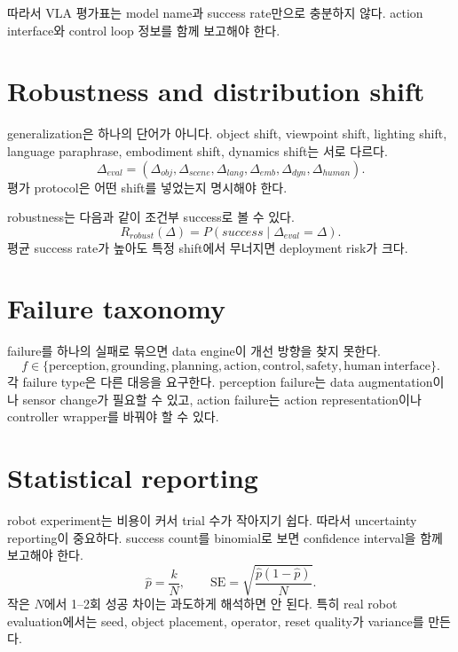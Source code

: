 따라서 VLA 평가표는 model name과 success rate만으로 충분하지 않다. action interface와 control loop 정보를 함께 보고해야 한다.

\section{Robustness and distribution shift}

generalization은 하나의 단어가 아니다. object shift, viewpoint shift, lighting shift, language paraphrase, embodiment shift, dynamics shift는 서로 다르다.
\begin{equation}
  \Delta_{eval}
  =
  (
  \Delta_{obj},
  \Delta_{scene},
  \Delta_{lang},
  \Delta_{emb},
  \Delta_{dyn},
  \Delta_{human}
  ).
  \label{eq:ch16-shift-vector}
\end{equation}
평가 protocol은 어떤 shift를 넣었는지 명시해야 한다.

robustness는 다음과 같이 조건부 success로 볼 수 있다.
\begin{equation}
  R_{robust}(\Delta)
  =
  P
  (
  success
  \mid
  \Delta_{eval}=\Delta
  ).
  \label{eq:ch16-robustness}
\end{equation}
평균 success rate가 높아도 특정 shift에서 무너지면 deployment risk가 크다.

\section{Failure taxonomy}

failure를 하나의 실패로 묶으면 data engine이 개선 방향을 찾지 못한다.
\begin{equation}
  f
  \in
  \{
  \mathrm{perception},
  \mathrm{grounding},
  \mathrm{planning},
  \mathrm{action},
  \mathrm{control},
  \mathrm{safety},
  \mathrm{human\ interface}
  \}.
  \label{eq:ch16-failure-taxonomy}
\end{equation}
각 failure type은 다른 대응을 요구한다. perception failure는 data augmentation이나 sensor change가 필요할 수 있고, action failure는 action representation이나 controller wrapper를 바꿔야 할 수 있다.

\section{Statistical reporting}

robot experiment는 비용이 커서 trial 수가 작아지기 쉽다. 따라서 uncertainty reporting이 중요하다. success count를 binomial로 보면 confidence interval을 함께 보고해야 한다.
\begin{equation}
  \hat{p}
  =
  \frac{k}{N},
  \qquad
  \mathrm{SE}
  =
  \sqrt{\frac{\hat{p}(1-\hat{p})}{N}}.
  \label{eq:ch16-success-se}
\end{equation}
작은 $N$에서 1--2회 성공 차이는 과도하게 해석하면 안 된다. 특히 real robot evaluation에서는 seed, object placement, operator, reset quality가 variance를 만든다.

